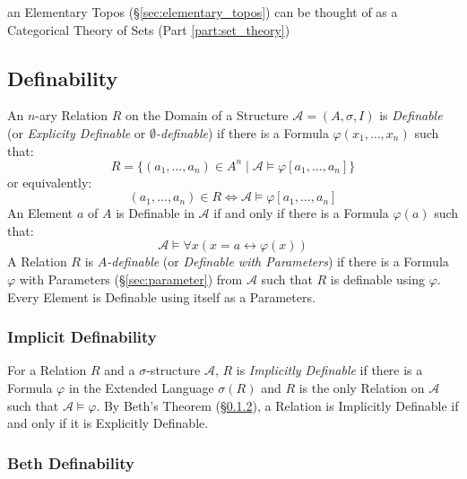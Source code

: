 an Elementary Topos (\S\ref{sec:elementary_topos}) can be thought of as a
Categorical Theory of Sets (Part \ref{part:set_theory})



\subsection{Definability}\label{sec:definability}

An $n$-ary Relation $R$ on the Domain of a Structure
$\mathcal{A} = (A, \sigma, I)$ is \emph{Definable} (or \emph{Explicity
Definable} or \emph{$\emptyset$-definable}) if there is a Formula
$\varphi (x_1,\ldots,x_n)$ such that:
\[
  R = \{(a_1,\ldots,a_n) \in A^n \;|\; \mathcal{A} \models \varphi
    [a_1, \ldots, a_n]\}
\]
or equivalently:
\[
  (a_1, \ldots, a_n) \in R \Leftrightarrow \mathcal{A} \models
    \varphi[a_1, \ldots, a_n]
\]
An Element $a$ of $A$ is Definable in $\mathcal{A}$ if and only if
there is a Formula $\varphi(a)$ such that:
\[
  \mathcal{A} \models \forall x (x = a \leftrightarrow \varphi(x))
\]
A Relation $R$ is \emph{$A$-definable} (or \emph{Definable with
  Parameters}) if there is a Formula $\varphi$ with Parameters
(\S\ref{sec:parameter}) from $\mathcal{A}$ such that $R$ is definable
using $\varphi$. Every Element is Definable using itself as a
Parameters.



\subsubsection{Implicit Definability}\label{sec:implicit_definability}

For a Relation $R$ and a $\sigma$-structure $\mathcal{A}$, $R$ is
\emph{Implicitly Definable} if there is a Formula $\varphi$ in the
Extended Language $\sigma(R)$ and $R$ is the only Relation on
$\mathcal{A}$ such that $\mathcal{A} \models \varphi$. By Beth's
Theorem (\S\ref{sec:beth_definability}), a Relation is Implicitly
Definable if and only if it is Explicitly Definable.



\subsubsection{Beth Definability}\label{sec:beth_definability}



